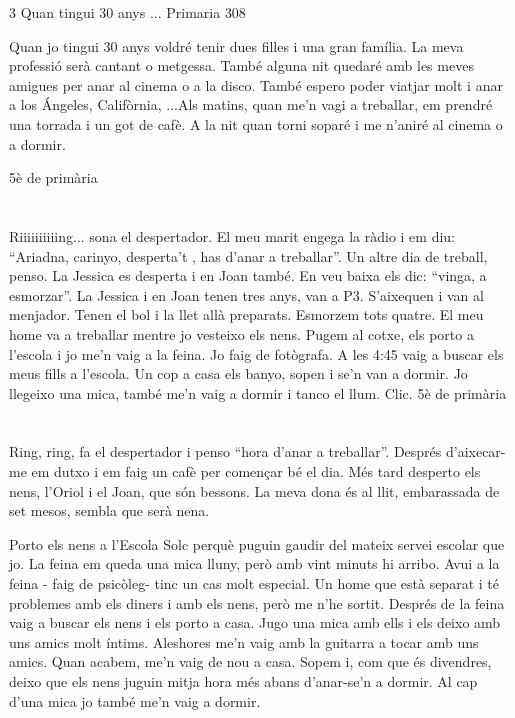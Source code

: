 \begin{news}
{3} %
{Quan tingui 30 anys ...}
{}
{Primaria}
{308}

Quan jo tingui 30 anys voldré tenir dues filles i una gran família. La meva professió serà cantant o metgessa. També alguna nit quedaré amb les meves amigues per anar al cinema o a la disco. També espero poder viatjar molt  i anar a los Ángeles, Califòrnia, ...Als matins, quan me’n vagi a treballar,  em prendré una torrada i un got de cafè. A la nit quan torni soparé i me n’aniré al cinema o a dormir.

							{5è de primària}

\section*{}
Riiiiiiiiiing... sona el despertador. El meu marit engega la ràdio i em diu: “Ariadna, carinyo, desperta’t ,  has d’anar a treballar”. Un altre dia de treball, penso. La Jessica es desperta i en Joan també. En veu baixa els dic: “vinga, a esmorzar”. La Jessica i en Joan tenen tres anys, van a P3. S’aixequen i van al menjador. Tenen el bol i la llet allà preparats. Esmorzem tots quatre. El meu home va a treballar mentre jo vesteixo els nens. Pugem al cotxe, els porto a l’escola i jo me’n vaig a la feina. Jo faig de fotògrafa. A les 4:45 vaig a buscar els  meus fills a l’escola. Un cop a casa els banyo, sopen i se’n van a dormir. Jo llegeixo una mica, també me’n vaig a dormir i tanco el llum. Clic.
							 {5è de primària}

\section*{}
Ring, ring, fa el despertador i penso “hora d’anar a treballar”. Després d’aixecar-me em dutxo i em faig un cafè per començar bé el dia. Més tard desperto els nens, l’Oriol i el Joan, que són bessons. La meva dona és al llit, embarassada de set mesos, sembla que serà nena.

Porto els nens a l’Escola Solc perquè puguin gaudir del mateix servei escolar que jo. La feina em queda una mica lluny, però amb vint minuts hi arribo. Avui a la feina - faig de psicòleg-  tinc un cas molt especial. Un home que està separat i té problemes amb els diners i amb els nens, però me n’he sortit. Després de la feina vaig a buscar els nens i els porto a casa. Jugo una mica amb ells i els deixo amb uns amics molt íntims. Aleshores me’n vaig amb la guitarra  a tocar amb uns amics. Quan acabem, me’n vaig de nou a casa. Sopem i,  com que és divendres,  deixo que els nens juguin mitja hora més abans d’anar-se’n a dormir. Al cap d’una mica jo també me’n vaig a dormir.


\end{news}
